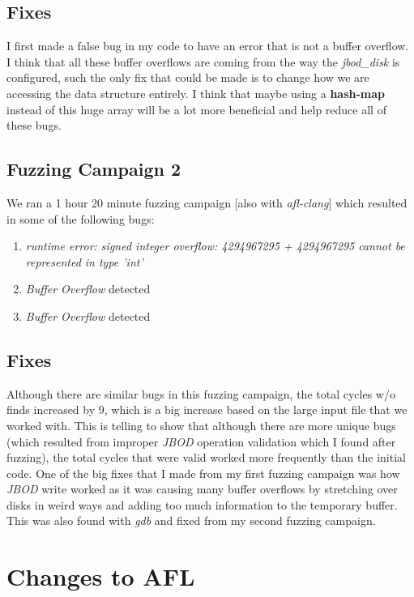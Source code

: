 \documentclass[11pt]{article}
\begin{document}
\subsection{Fixes}
I first made a false bug in my code to have an error that is not a buffer overflow. I think that all these buffer overflows are coming from the way the \textit{jbod\_disk} is configured, such the only fix that could be made is to change how we are accessing the data structure entirely. I think that maybe using a \textbf{hash-map} instead of this huge array will be a lot more beneficial and help reduce all of these bugs. 


\subsection{Fuzzing Campaign 2}
We ran a 1 hour 20 minute fuzzing campaign [also with \textit{afl-clang}] which resulted in some of the following bugs:
\begin{enumerate}
    \item \textit{runtime error: signed integer overflow: 4294967295 + 4294967295 cannot be represented in type 'int'}
    \item \textit{Buffer Overflow} detected
    \item \textit{Buffer Overflow} detected
\end{enumerate}

\subsection{Fixes}
Although there are similar bugs in this fuzzing campaign, the total cycles w/o finds increased by 9, which is a big increase based on the large input file that we worked with. This is telling to show that although there are more unique bugs (which resulted from improper \textit{JBOD} operation validation which I found after fuzzing), the total cycles that were valid worked more frequently than the initial code. One of the big fixes that I made from my first fuzzing campaign was how \textit{JBOD} write worked as it was causing many buffer overflows by stretching over disks in weird ways and adding too much information to the temporary buffer. This was also found with \textit{gdb} and fixed from my second fuzzing campaign. 




\newpage

\section{Changes to AFL}
\end{document}
